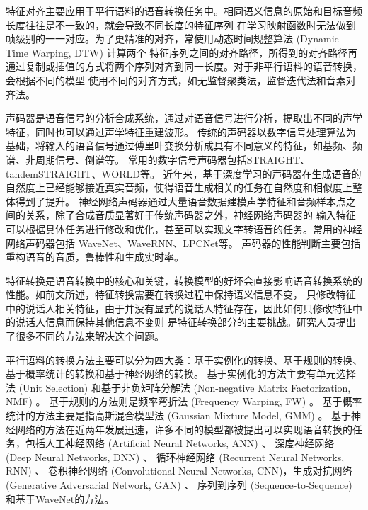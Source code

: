 特征对齐主要应用于平行语料的语音转换任务中。相同语义信息的原始和目标音频长度往往是不一致的，就会导致不同长度的特征序列
在学习映射函数时无法做到帧级别的一一对应。为了更精准的对齐，常使用动态时间规整算法 (Dynamic Time Warping, DTW) 计算两个
特征序列之间的对齐路径，所得到的对齐路径再通过复制或插值的方式将两个序列对齐到同一长度。对于非平行语料的语音转换，会根据不同的模型
使用不同的对齐方式，如无监督聚类法\cite{sundermann2003vtln}，监督迭代法\cite{erro2009inca}和音素对齐法\cite{ye2004voice}。

声码器是语音信号的分析合成系统，通过对语音信号进行分析，提取出不同的声学特征，同时也可以通过声学特征重建波形。
传统的声码器以数字信号处理算法为基础，将输入的语音信号通过傅里叶变换分析成具有不同意义的特征，如基频、频谱、非周期信号、倒谱等。
常用的数字信号声码器包括STRAIGHT\cite{kawahara1997speech}、tandemSTRAIGHT\cite{kawahara2008tandem}、WORLD\cite{morise2016world}等。
近年来，基于深度学习的声码器在生成语音的自然度上已经能够接近真实音频，使得语音生成相关的任务在自然度和相似度上整体得到了提升。
神经网络声码器通过大量语音数据建模声学特征和音频样本点之间的关系，除了合成音质显著好于传统声码器之外，神经网络声码器的
输入特征可以根据具体任务进行修改和优化，甚至可以实现文字转语音的任务。常用的神经网络声码器包括
WaveNet\cite{oord2016wavenet,tamamori2017speaker,oord2017parallel}、WaveRNN\cite{kalchbrenner2018efficient}、LPCNet\cite{valin2019lpcnet}等。
声码器的性能判断主要包括重构语音的音质，鲁棒性和生成实时率。

特征转换是语音转换中的核心和关键，转换模型的好坏会直接影响语音转换系统的性能。如前文所述，特征转换需要在转换过程中保持语义信息不变，
只修改特征中的说话人相关特征，由于并没有显式的说话人特征存在，因此如何只修改特征中的说话人信息而保持其他信息不变则
是特征转换部分的主要挑战。研究人员提出了很多不同的方法来解决这个问题。

平行语料的转换方法主要可以分为四大类：基于实例化的转换、基于规则的转换、基于概率统计的转换和基于神经网络的转换。
基于实例化的方法主要有单元选择法 (Unit Selection)\cite{shuang2008voice,sundermann2006text,wu2013exemplar} 
和基于非负矩阵分解法 (Non-negative Matrix Factorization, NMF)\cite{takashima2012exemplar,wu2014exemplar,zhang2015regularized} 。
基于规则的方法则是频率弯折法 (Frequency Warping, FW)\cite{shuang2008voice,erro2009voice,tian2015sparse,Toda2001Voice} 。
基于概率统计的方法主要是指高斯混合模型法 (Gaussian Mixture Model, GMM)\cite{chen2003voice,kain1998spectral,kobayashi2016nu,stylianou1998continuous} 。
基于神经网络的方法在近两年发展迅速，许多不同的模型都被提出可以实现语音转换的任务，包括人工神经网络 (Artificial Neural Networks, ANN)\cite{desai2010spectral} 、
深度神经网络 (Deep Neural Networks, DNN)\cite{aryal2015articulatory,chen2014voice} 、
循环神经网络 (Recurrent Neural Networks, RNN)\cite{nakashika2015voice,sun2015voice} 、
卷积神经网络 (Convolutional Neural Networks, CNN)\cite{kaneko2017sequence}，生成对抗网络(Generative Adversarial Network, GAN)\cite{hsu2017voice,kaneko2017sequence} 、
序列到序列 (Sequence-to-Sequence)\cite{kameoka2018convs2s,tanaka2019atts2s,zhang2019improving} 
和基于WaveNet的方法\cite{polyak2019attention}。

